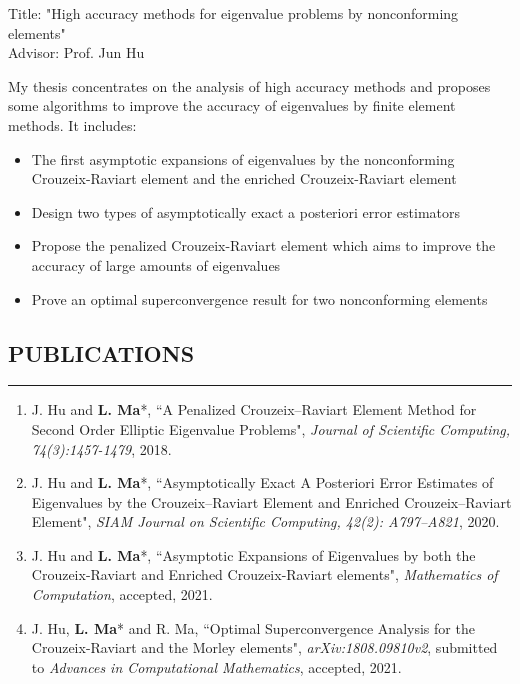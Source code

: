 \documentclass[10pt,a4]{article}
\begin{document}
\begin{small}
\begin{list}{}{}
\item Title: "High accuracy methods for eigenvalue problems by nonconforming elements"  \\
Advisor: Prof. Jun Hu
\item My thesis concentrates on the analysis of high accuracy methods and proposes some algorithms to improve the accuracy of eigenvalues by finite element methods.  It includes:
\begin{itemize}
\item The first asymptotic expansions of eigenvalues by the nonconforming Crouzeix-Raviart element and the enriched Crouzeix-Raviart element 
\item Design two types of asymptotically exact a posteriori error estimators
\item Propose the penalized Crouzeix-Raviart element which aims to improve the accuracy of large amounts of eigenvalues
\item Prove an optimal superconvergence result for two nonconforming elements
\end{itemize}
\end{list}

 
\subsection*{PUBLICATIONS}
\hrule
\vspace{0.2cm} 
\begin{enumerate}
	\item J. Hu and \textbf{L. Ma}*, ``A Penalized Crouzeix--Raviart Element Method for Second Order Elliptic Eigenvalue Problems",  {\it Journal of Scientific Computing, 74(3):1457-1479}, 2018.
	
	\item J. Hu and \textbf{L. Ma}*, ``Asymptotically Exact A Posteriori Error Estimates of Eigenvalues by the Crouzeix--Raviart Element and Enriched Crouzeix--Raviart Element",  {\it SIAM Journal on Scientific Computing, 42(2): A797--A821}, 2020.
	
	\item J. Hu and \textbf{L. Ma}*, ``Asymptotic Expansions of Eigenvalues by both the Crouzeix-Raviart and Enriched Crouzeix-Raviart elements", {\it Mathematics of Computation}, accepted, 2021.

	
	\item J. Hu, \textbf{L. Ma}* and R. Ma, ``Optimal Superconvergence Analysis for the Crouzeix-Raviart and the Morley elements",  {\it arXiv:1808.09810v2}, submitted to {\it Advances in Computational Mathematics}, accepted, 2021.


\end{enumerate}
\end{small}
\end{document}
